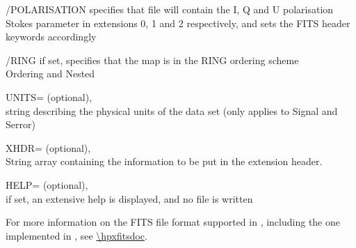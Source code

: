 \begin{keywords}
\begin{kwlist}{}
	\item[{/POLARISATION}] 
	  specifies that file will contain the I, Q and U polarisation
           Stokes parameter in extensions 0, 1 and 2 respectively, and sets the
FITS header keywords accordingly

	\item[{/RING}]   if set, specifies that the map is in the RING ordering
	scheme\\
	\seealso Ordering and Nested

	\item[{UNITS=}] 
		(optional), \\
		string describing the physical units of the data set (only applies
		to Signal and Serror)

    	\item[XHDR=] %
		(optional), \\
		String array containing the information to be put in
		the extension header. 

    	\item[HELP=] %
		(optional), \\
		if set, an extensive help is displayed, and no file is written

   \end{kwlist}
\end{keywords}

\begin{codedescription}
{For more information on the FITS file format supported in \healpix, 
including the one implemented in \facname,
see \url{\hpxfitsdoc}.}

\end{codedescription}



